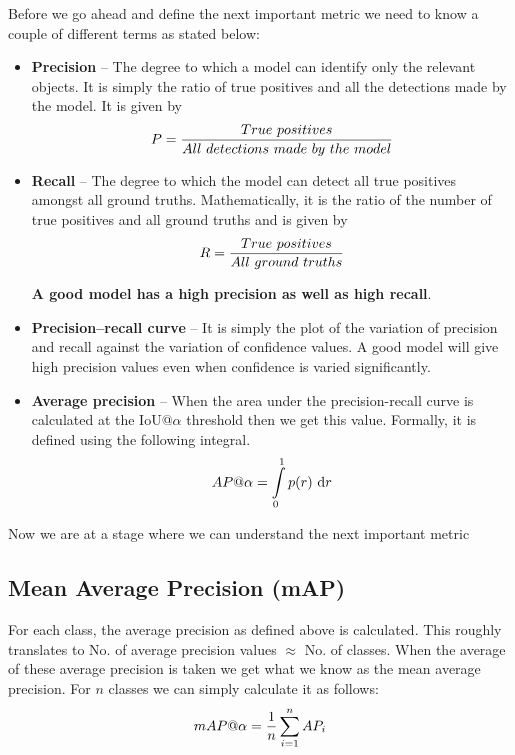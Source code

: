 Before we go ahead and define the next important metric we need to know a couple of different terms as stated below:
\begin{itemize}
  \item \textbf{Precision} – The degree to which a model can identify only the relevant objects. It is simply the ratio of true positives and all the detections made by the model. It is given by
        \begin{equation}
          \centering
          P = \frac{True \ positives}{All \ detections \ made \ by \ the \ model}
        \end{equation}
  \item \textbf{Recall} – The degree to which the model can detect all true positives amongst all ground truths. Mathematically, it is the ratio of the number of true positives and all ground truths and is given by
        \begin{equation}
          \centering
          R = \frac{True \ positives}{All \ ground \ truths}
        \end{equation}

        \textbf{A good model has a high precision as well as high recall}.

  \item \textbf{Precision–recall curve} – It is simply the plot of the variation of precision and recall against the variation of confidence values. A good model will give high precision values even when confidence is varied significantly.
  \item \textbf{Average precision} – When the area under the precision-recall curve is calculated at the IoU@$\alpha$ threshold then we get this value. Formally, it is defined using the following integral.
        \begin{equation}
          \centering
          AP@\alpha = \int\limits_{0}^{1} p(r) \ \mathrm{d} r
        \end{equation}

\end{itemize}

Now we are at a stage where we can understand the next important metric

\subsection{Mean Average Precision (mAP)}
For each class, the average precision as defined above is calculated. This roughly translates to No. of average precision values $\approx$ No. of classes. When the average of these average precision is taken we get what we know as the mean average precision. For $n$ classes we can simply calculate it as follows:
\begin{equation}
  \centering
  mAP@\alpha = \frac{1}{n} \sum_{i=1}^{n} AP_{i}
\end{equation}


